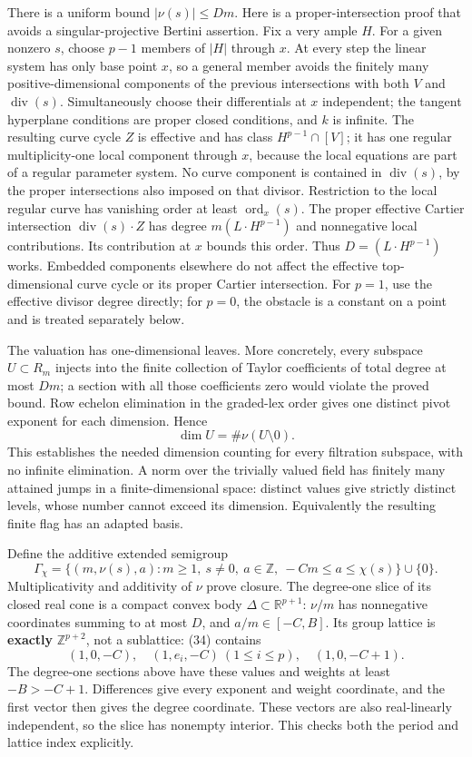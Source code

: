 \documentclass[
  10pt,
]{article}
\begin{document}
There is a uniform bound \(|\nu(s)|\leq Dm\). Here is a
proper-intersection proof that avoids a singular-projective Bertini
assertion. Fix a very ample \(H\). For a given nonzero \(s\), choose
\(p-1\) members of \(|H|\) through \(x\). At every step the linear
system has only base point \(x\), so a general member avoids the
finitely many positive-dimensional components of the previous
intersections with both \(V\) and \(\operatorname{div}(s)\).
Simultaneously choose their differentials at \(x\) independent; the
tangent hyperplane conditions are proper closed conditions, and \(k\) is
infinite. The resulting curve cycle \(Z\) is effective and has class
\(H^{p-1}\cap[V]\); it has one regular multiplicity-one local component
through \(x\), because the local equations are part of a regular
parameter system. No curve component is contained in
\(\operatorname{div}(s)\), by the proper intersections also imposed on
that divisor. Restriction to the local regular curve has vanishing order
at least \(\operatorname{ord}_x(s)\). The proper effective Cartier
intersection \(\operatorname{div}(s)\cdot Z\) has degree
\(m(L\cdot H^{p-1})\) and nonnegative local contributions. Its
contribution at \(x\) bounds this order. Thus \(D=(L\cdot H^{p-1})\)
works. Embedded components elsewhere do not affect the effective
top-dimensional curve cycle or its proper Cartier intersection. For
\(p=1\), use the effective divisor degree directly; for \(p=0\), the
obstacle is a constant on a point and is treated separately below.

The valuation has one-dimensional leaves. More concretely, every
subspace \(U\subset R_m\) injects into the finite collection of Taylor
coefficients of total degree at most \(Dm\); a section with all those
coefficients zero would violate the proved bound. Row echelon
elimination in the graded-lex order gives one distinct pivot exponent
for each dimension. Hence
\[ \dim U=\#\nu(U\setminus0).                                                                   \tag{33}\]
This establishes the needed dimension counting for every filtration
subspace, with no infinite elimination. A norm over the trivially valued
field has finitely many attained jumps in a finite-dimensional space:
distinct values give strictly distinct levels, whose number cannot
exceed its dimension. Equivalently the resulting finite flag has an
adapted basis.

Define the additive extended semigroup
\[ \Gamma_\chi=\{(m,\nu(s),a):m\geq1,\ s\ne0,\ a\in\mathbb Z,\ -Cm\leq a\leq\chi(s)\}\cup\{0\}. \tag{34}\]
Multiplicativity and additivity of \(\nu\) prove closure. The degree-one
slice of its closed real cone is a compact convex body
\(\Delta\subset\mathbb R^{p+1}\): \(\nu/m\) has nonnegative coordinates
summing to at most \(D\), and \(a/m\in[-C,B]\). Its group lattice is
\textbf{exactly} \(\mathbb Z^{p+2}\), not a sublattice: (34) contains
\[ (1,0,-C),\quad(1,e_i,-C)\ (1\leq i\leq p),\quad(1,0,-C+1). \] The
degree-one sections above have these values and weights at least
\(-B>-C+1\). Differences give every exponent and weight coordinate, and
the first vector then gives the degree coordinate. These vectors are
also real-linearly independent, so the slice has nonempty interior. This
checks both the period and lattice index explicitly.
\end{document}
